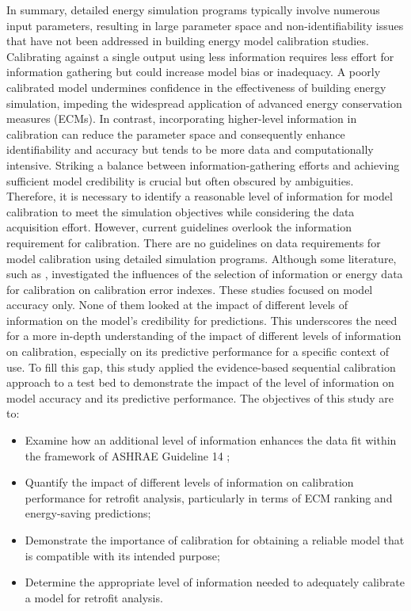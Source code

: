 \documentclass[3p,times,12pt]{elsarticle}
\begin{document}
\begin{sloppypar}
In summary, detailed energy simulation programs typically involve numerous input parameters, resulting in large parameter space and non-identifiability issues that have not been addressed in building energy model calibration studies. Calibrating against a single output using less information requires less effort for information gathering but could increase model bias or inadequacy. A poorly calibrated model undermines confidence in the effectiveness of building energy simulation, impeding the widespread application of advanced energy conservation measures (ECMs). In contrast, incorporating higher-level information in calibration can reduce the parameter space and consequently enhance identifiability and accuracy but tends to be more data and computationally intensive. Striking a balance between information-gathering efforts and achieving sufficient model credibility is crucial but often obscured by ambiguities. Therefore, it is necessary to identify a reasonable level of information for model calibration to meet the simulation objectives while considering the data acquisition effort. However, current guidelines \cite{guideline200214, united2001international, femp2015m} overlook the information requirement for calibration. There are no guidelines on data requirements for model calibration using detailed simulation programs. Although some literature, such as \cite{bertagnolio2012evidence, lim2018influences, derakhti2022impact}, investigated the influences of the selection of information or energy data for calibration on calibration error indexes. These studies focused on model accuracy only. None of them looked at the impact of different levels of information on the model's credibility for predictions. This underscores the need for a more in-depth understanding of the impact of different levels of information on calibration, especially on its predictive performance for a specific context of use. 
To fill this gap, this study applied the evidence-based sequential calibration approach to a test bed to demonstrate the impact of the level of information on model accuracy and its predictive performance. The objectives of this study are to:

\begin{itemize}
    \item Examine how an additional level of information enhances the data fit within the framework of ASHRAE Guideline 14 \cite{guideline200214}; 
    \item Quantify the impact of different levels of information on calibration performance for retrofit analysis, particularly in terms of ECM ranking and energy-saving predictions;
    \item Demonstrate the importance of calibration for obtaining a reliable model that is compatible with its intended purpose;
    \item Determine the appropriate level of information needed to adequately calibrate a model for retrofit analysis.
\end{itemize}



\end{sloppypar}
\end{document}
